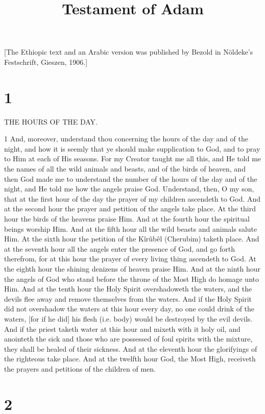

\title{Testament of Adam}

[The Ethiopic text and an Arabic version was published by Bezold in Nöldeke's Festschrift, Gieszen, 1906.]

\chapter{1}

\par THE HOURS OF THE DAY.

\par 1 And, moreover, understand thou concerning the hours of the day and of the night, and how it is seemly that ye should make supplication to God, and to pray to Him at each of His seasons. For my Creator taught me all this, and He told me the names of all the wild animals and beasts, and of the birds of heaven, and then God made me to understand the number of the hours of the day and of the night, and He told me how the angels praise God. Understand, then, O my son, that at the first hour of the day the prayer of my children ascendeth to God. And at the second hour the prayer and petition of the angels take place. At the third hour the birds of the heavens praise Him. And at the fourth hour the spiritual beings worship Him. And at the fifth hour all the wild beasts and animals salute Him. At the sixth hour the petition of the Kîrûbêl (Cherubim) taketh place. And at the seventh hour all the angels enter the presence of God, and go forth therefrom, for at this hour the prayer of every living thing ascendeth to God. At the eighth hour the shining denizens of heaven praise Him. And at the ninth hour the angels of God who stand before the throne of the Most High do homage unto Him. And at the tenth hour the Holy Spirit overshadoweth the waters, and the devils flee away and remove themselves from the waters. And if the Holy Spirit did not overshadow the waters at this hour every day, no one could drink of the waters, [for if he did] his flesh (i.e. body) would be destroyed by the evil devils. And if the priest taketh water at this hour and mixeth with it holy oil, and anointeth the sick and those who are possessed of foul spirits with the mixture, they shall be healed of their sickness. And at the eleventh hour the glorifyings of the righteous take place. And at the twelfth hour God, the Most High, receiveth the prayers and petitions of the children of men.

\chapter{2}


